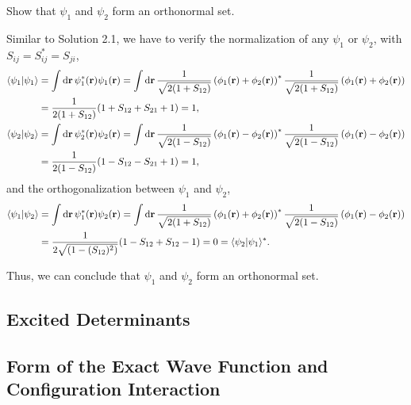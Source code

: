 \documentclass[a4paper]{book}
\newcounter{exercise}[chapter]
\newcounter{solution}[chapter]
\newcommand*{\dif}{\mathop{}\!\mathrm{d}}
\newcommand{\bfr}{{\bf r}}
\begin{document}
		\begin{exercise}
	Show that $\psi_1$ and $\psi_2$ form an orthonormal set.
	\end{exercise}
	
	\begin{solution}
	Similar to Solution 2.1, we have to verify the normalization of any $\psi_1$ or $\psi_2$, with $S_{ij} = S^*_{ij} = S_{ji}$,
	\begin{align}
		\langle \psi_1 | \psi_1 \rangle &= \int \dif \bfr \, \psi^*_1( \bfr ) \psi_1( \bfr ) = \int \dif \bfr \,  \frac{1}{ \sqrt{ 2 ( 1 + S_{12} ) } } \left( \phi_1(\bfr) + \phi_2(\bfr) \right)^* \frac{1}{ \sqrt{ 2 ( 1 + S_{12} ) } } \left( \phi_1(\bfr) + \phi_2(\bfr) \right) \notag \\
		&= \frac{1}{ 2 ( 1 + S_{12} ) } ( 1 + S_{12} + S_{21} + 1 ) = 1, \\
		\langle \psi_2 | \psi_2 \rangle &= \int \dif \bfr \, \psi^*_2( \bfr ) \psi_2( \bfr ) = \int \dif \bfr \,  \frac{1}{ \sqrt{ 2 ( 1 - S_{12} ) } } \left( \phi_1(\bfr) - \phi_2(\bfr) \right)^* \frac{1}{ \sqrt{ 2 ( 1 - S_{12} ) } } \left( \phi_1(\bfr) - \phi_2(\bfr) \right) \notag \\
		&= \frac{1}{ 2 ( 1 - S_{12} ) } ( 1 - S_{12} - S_{21} + 1 ) = 1,
	\end{align}
	and the orthogonalization between $\psi_1$ and $\psi_2$,
	\begin{align}
		\langle \psi_1 | \psi_2 \rangle &= \int \dif \bfr \, \psi^*_1( \bfr ) \psi_2( \bfr ) = \int \dif \bfr \,  \frac{1}{ \sqrt{ 2 ( 1 + S_{12} ) } } \left( \phi_1(\bfr) + \phi_2(\bfr) \right)^* \frac{1}{ \sqrt{ 2 ( 1 - S_{12} ) } } \left( \phi_1(\bfr) - \phi_2(\bfr) \right) \notag \\
		&= \frac{1}{ 2 \sqrt{  ( 1 - (S_{12})^2 ) } } ( 1 - S_{12} + S_{12} - 1 ) = 0 = \langle \psi_2 | \psi_1 \rangle^*.
	\end{align}	
	
	Thus, we can conclude that $\psi_1$ and $\psi_2$ form an orthonormal set.
	\end{solution}
	
	\subsection{Excited Determinants}
	
	\subsection{Form of the Exact Wave Function and Configuration Interaction}
	
\end{document}
